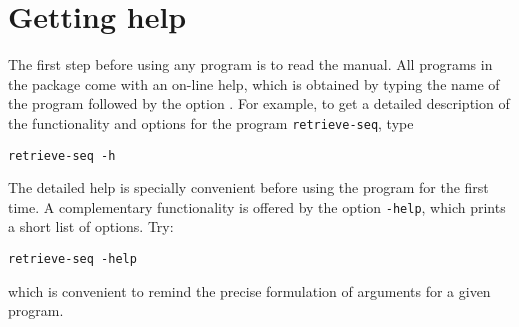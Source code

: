\chapter{Getting help} 

The first step before using any program is to read the manual. All
programs in the \RSAT package come with an on-line help, which is
obtained by typing the name of the program followed by the option
. For example, to get a detailed description of the
functionality and options for the program \texttt{retrieve-seq}, type

\begin{lstlisting}
retrieve-seq -h
\end{lstlisting}

The detailed help is specially convenient before using the program for
the first time. A complementary functionality is offered by the option
\texttt{-help}, which prints a short list of options. Try:

\begin{lstlisting}
retrieve-seq -help
\end{lstlisting}

which is convenient to remind the precise formulation of arguments for
a given program.



